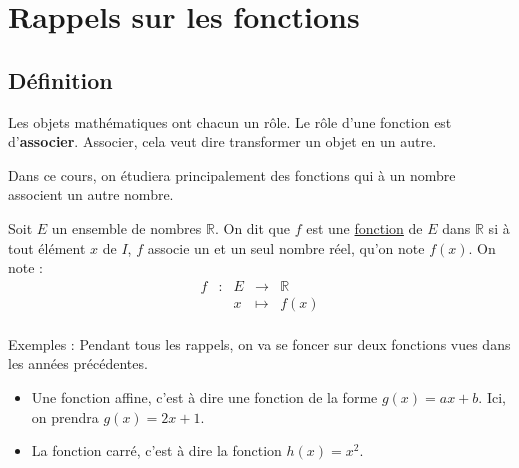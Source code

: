 \documentclass[10pt,a4paper]{book}
\newcommand{\R}{\mathbb{R}}
\begin{document}
\section{Rappels sur les fonctions}



\subsection{Définition}

Les objets mathématiques ont chacun un rôle. Le rôle d'une fonction est d'\textbf{associer}. Associer, cela veut dire transformer un objet en un autre.

Dans ce cours, on étudiera principalement des fonctions qui à un nombre associent un autre nombre. 

\begin{de}
    Soit $E$ un ensemble de nombres $\R$. On dit que $f$ est une \underline{fonction} de $E$ dans $\R$ si à tout élément $x$ de $I$,  $f$ associe un et un seul nombre réel, qu'on note $f(x)$.
    On note :
        \[
        \begin{array}{ccccc}
        f & : & E & \to & \R \\
         & & x & \mapsto & f(x) \\
        \end{array}
        \]
\end{de}

Exemples : Pendant tous les rappels, on va se foncer sur deux fonctions vues dans les années précédentes.
\begin{itemize}
    \item Une fonction affine, c'est à dire une fonction de la forme $g(x)=ax+b$. Ici, on prendra $g(x)=2x+1$.
    \item La fonction carré, c'est à dire la fonction $h(x)=x^2$.
\end{itemize}
\end{document}
